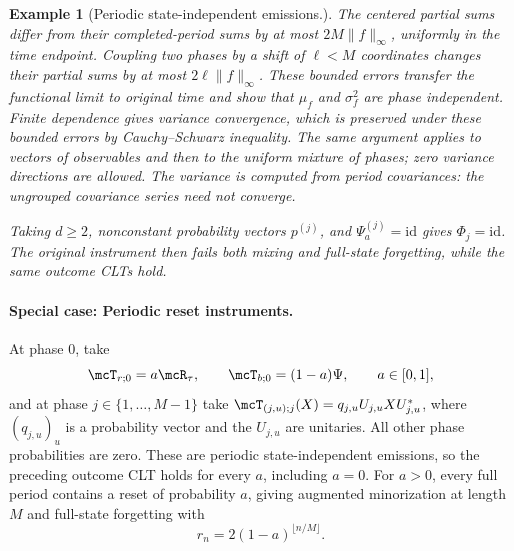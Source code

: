 \documentclass[a4paper]{article}
\numberwithin{equation}{section}   %
\theoremstyle{plain}   %
\theoremstyle{plain}   %
\theoremstyle{examplestyle}
\newtheorem{example}{Example}
\begin{document}
\begin{appendix}
\begin{example}[Periodic state-independent emissions.]
    The centered partial sums differ from their completed-period sums by at most $2M\|f\|_\infty$, uniformly in the time endpoint.
    Coupling two phases by a shift of $\ell<M$ coordinates changes their partial sums by at most $2\ell\|f\|_\infty$.
    These bounded errors transfer the functional limit to original time and show that $\mu_f$ and $\sigma_f^2$ are phase independent.
    Finite dependence gives variance convergence, which is preserved under these bounded errors by Cauchy--Schwarz inequality.
    The same argument applies to vectors of observables and then to the uniform mixture of phases; zero variance directions are allowed.
    The variance is computed from period covariances: the ungrouped covariance series need not converge.
    
    Taking $d\ge2$, nonconstant probability vectors $p^{(j)}$, and $\Psi_a^{(j)}=\mathrm{id}$ gives $\Phi_j=\mathrm{id}$.
    The original instrument then fails both mixing and full-state  forgetting, while the same outcome CLTs hold.
\end{example}

\paragraph{Special case: Periodic reset instruments.}
\label{par:periodic-reset-instruments}
    At phase $0$, take
    \[
         \mcT_{r;0}=a\mcR_\tau,
         \qquad
         \mcT_{b;0}=(1-a)\Psi,
         \qquad a\in[0,1],
    \]
    and at phase $j\in\{1,\ldots,M-1\}$ take $\mcT_{(j,u);j}(X)=q_{j,u}U_{j,u}XU_{j,u}^*$, where $(q_{j,u})_u$ is a probability vector and the $U_{j,u}$ are unitaries. 
    All other phase probabilities are zero.
    These are periodic state-independent emissions, so the preceding outcome CLT holds for every $a$, including $a=0$.
    For $a>0$, every full period contains a reset of probability $a$, giving augmented minorization at length $M$ and full-state forgetting with
    \[
     r_n=2(1-a)^{\lfloor n/M\rfloor}.
    \]


\end{appendix}


\setlength{\bibitemsep}{2pt}
\printbibliography[heading=bibintoc,title={References}]

\end{document}
